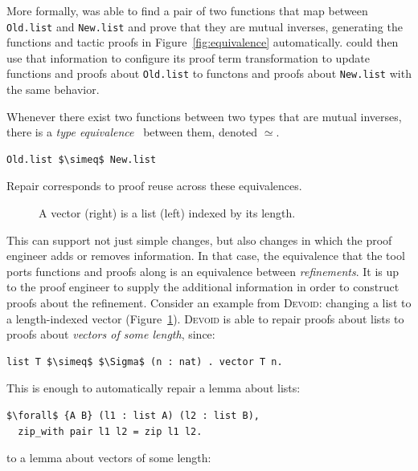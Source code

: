 More formally, \toolname was able to find a pair of two functions that map between \lstinline{Old.list}
and \lstinline{New.list} and prove that they are mutual inverses, generating the functions and tactic
proofs in Figure~\ref{fig:equivalence} automatically.
\toolname could then use that information to configure its proof term transformation to update
functions and proofs about \lstinline{Old.list} to functons and proofs about \lstinline{New.list} with
the same behavior.

Whenever there exist two functions between two types that are mutual inverses,
there is a \textit{type equivalence}~\cite{univalent2013homotopy} between them, denoted $\simeq$.

\begin{lstlisting}
Old.list $\simeq$ New.list
\end{lstlisting}
Repair corresponds to proof reuse across these equivalences.

\begin{figure}
\begin{minipage}{0.40\textwidth}
   
\end{minipage}
\hfill
\begin{minipage}{0.58\textwidth}
   
\end{minipage}
\caption{A vector (right) is a list (left) indexed by its length.}
\label{fig:listtovect}
\end{figure}

This can support not just simple changes, but also changes in which the proof engineer adds or removes information.
In that case, the equivalence that the tool ports functions and proofs along
is an equivalence between \textit{refinements}.
It is up to the proof engineer to supply the additional information in order to construct proofs about the refinement.
Consider an example from \textsc{Devoid}: changing a list to a length-indexed vector (Figure~\ref{fig:listtovect}).
\textsc{Devoid} is able to repair proofs about lists to proofs about \textit{vectors of some length}, since:

\begin{lstlisting}
list T $\simeq$ $\Sigma$ (n : nat) . vector T n.
\end{lstlisting}
This is enough to automatically repair a lemma about lists:

\begin{lstlisting}
$\forall$ {A B} (l1 : list A) (l2 : list B),
  zip_with pair l1 l2 = zip l1 l2.
\end{lstlisting}
to a lemma about vectors of some length:


